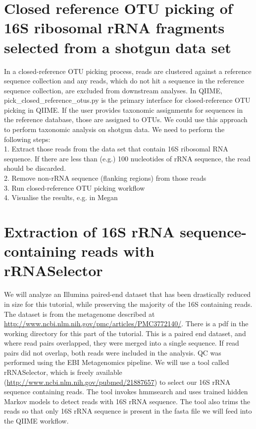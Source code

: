 \section{Closed reference OTU picking of 16S ribosomal rRNA fragments selected from a shotgun data set}

In a closed-reference OTU picking process, reads are clustered against a reference sequence collection and any reads, which do not hit a sequence in the reference sequence collection, are excluded from downstream analyses. In QIIME, pick_closed_reference_otus.py is the primary interface for closed-reference OTU picking in QIIME. If the user provides taxonomic assignments for sequences in the reference database, those are assigned to OTUs. We could use this approach to perform taxonomic analysis on shotgun data. We need to perform the following steps:\\
1.	Extract those reads from the data set that contain 16S ribosomal RNA sequence. If there are less than (e.g.) 100 nucleotides of rRNA sequence, the read should be discarded.\\
2.	Remove non-rRNA sequence (flanking regions) from those reads\\
3.	Run closed-reference OTU picking workflow\\
4.	Visualise the results, e.g. in Megan\\

\section{Extraction of 16S rRNA sequence-containing reads with rRNASelector}

We will analyze an Illumina paired-end dataset that has been drastically reduced in size for this tutorial, while preserving the majority of the 16S containing reads. The dataset is from the metagenome described at \url{http://www.ncbi.nlm.nih.gov/pmc/articles/PMC3772140/}. There is a pdf in the working directory for this part of the tutorial. This is a paired end dataset, and where read pairs overlapped, they were merged into a single sequence. If read pairs did not overlap, both reads were included in the analysis. QC was performed using the EBI Metagenomics pipeline.
We will use a tool called rRNASelector, which is freely available (\url{http://www.ncbi.nlm.nih.gov/pubmed/21887657}) to select our 16S rRNA sequence containing reads.  The tool invokes hmmsearch and uses trained hidden Markov models to detect reads with 16S rRNA sequence. The tool also trims the reads so that only 16S rRNA sequence is present in the fasta file we will feed into the QIIME workflow.

